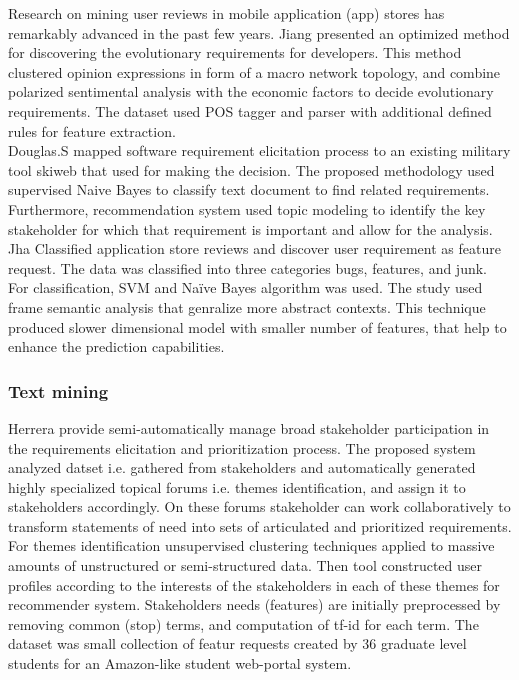 	Research on mining user reviews in mobile application (app) stores has
remarkably advanced in the past few years. Jiang \etal \cite{Jiang:2014}
presented an optimized method for discovering the evolutionary requirements for
developers. This method clustered opinion expressions in form of a macro network
topology, and combine polarized sentimental analysis with the economic factors
to decide evolutionary requirements. The dataset used POS tagger and parser with
additional defined rules for feature extraction.\\

	 Douglas.S \etal\cite{Douglas:S2008} mapped software requirement elicitation process to an
existing military tool skiweb that used for making the decision. The proposed
methodology used supervised Naive Bayes to classify text document to find
related requirements. Furthermore, recommendation system used topic modeling to
identify the key stakeholder for which that requirement is important and allow
for the analysis.\\

	 Jha \etal \cite{Jha:2017} Classified application store reviews
and discover user requirement as feature request. The data was classified into
three categories bugs, features, and junk. For classification, SVM and Naïve
Bayes algorithm was used. The study used frame semantic analysis that genralize
more abstract contexts. This technique produced slower dimensional model with
smaller number of features, that help to enhance the prediction
capabilities.\\


\subsubsection{Text mining}

 
 	Herrera \etal \cite{Castro-Herrera:2009} provide semi-automatically manage broad stakeholder participation in the requirements elicitation and prioritization process. 
The proposed system analyzed datset i.e. gathered from stakeholders and automatically generated highly specialized topical forums i.e. themes identification, and assign it to stakeholders accordingly.
On these forums stakeholder can work collaboratively to transform statements of need into sets of articulated and prioritized requirements. For themes identification unsupervised clustering
techniques applied to massive amounts of unstructured or semi-structured data. Then tool constructed user profiles according to the interests
of the stakeholders in each of these themes for recommender system. Stakeholders
needs (features) are initially preprocessed by removing common (stop) terms, and
computation of tf-id for each term. The dataset was  small collection of featur requests created by 36 graduate level students for an Amazon-like student web-portal system.\\

